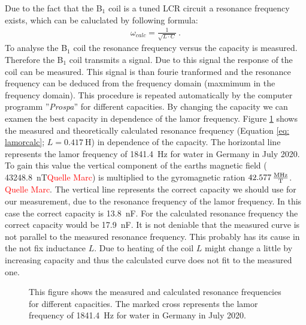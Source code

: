 Due to the fact that the B$_1$ coil is a tuned LCR circuit a resonance frequency exists, which can be caluclated by following formula:
\begin{align}
    \omega_{calc} = \frac{1}{\sqrt{L \cdot C}} \ .
    \label{eq: lamorcalc}
\end{align}
To analyse the B$_1$ coil the resonance frequency versus the capacity is measured. Therefore the B$_1$ coil transmits a signal. Due to this signal the response of the coil can be measured. This signal is than fourie tranformed and the resonance frequency can be deduced from the frequency domain (maxmimum in the frequency domain). This procedure is repeated automatically by the computer programm ''\textit{Prospa}'' for different capacities. By changing the capacity we can examen the best capacity in dependence of the lamor frequency. Figure \ref{fig: Coilanalyse} shows the measured and theoretically calculated resonance frequency (Equation \ref{eq: lamorcalc}; $L = \SI{0.417}{\henry}$) in dependence of the capacity. The horizontal line represents the lamor frequency of \SI{1841.4}{\hertz} for water in Germany in July 2020. To gain this value the vertical component of the earths magnetic field ( \SI{43248.8}{\nano \tesla}\textcolor{red}{Quelle Marc}) is multiplied to the gyromagnetic ration $\SI{42.577}{\frac{\mega \hertz}{\tesla}}$. \textcolor{red}{Quelle Marc}. The vertical line represents the correct capacity we should use for our measurement, due to the resonance frequency of the lamor frequency. In this case the correct capacity is \SI{13.8}{\nano \farad}. For the calculated resonance frequency the correct capacity would be \SI{17.9}{\nano \farad}. It is not deniable that the measured curve is not parallel to the measured resonance frequency. This probably has its cause in the not fix inductance $L$. Due to heating of the coil $L$ might change a little by increasing capacity and thus the calculated curve does not fit to the measured one.


\begin{figure}[H]
    \centering
    
    \caption[This figure shows the measured and calculated resonance frequencies for different capacities.]{This figure shows the measured and calculated resonance frequencies for different capacities. The marked cross represents the lamor frequency of \SI{1841.4}{\hertz} for water in Germany in July 2020.}
    \label{fig: Coilanalyse}
\end{figure}